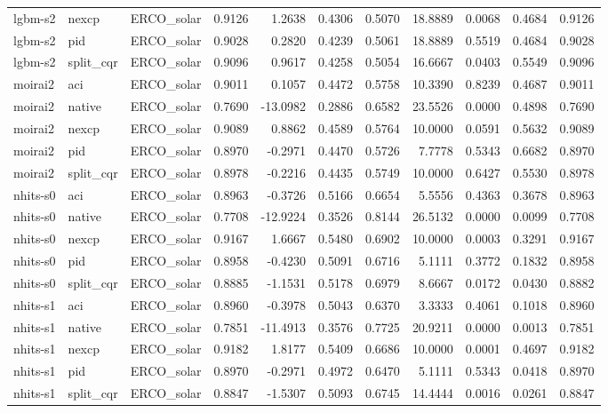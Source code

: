 \begin{tabular}{lllrrrrrrrr}
lgbm-s2 & nexcp & ERCO_solar & 0.9126 & 1.2638 & 0.4306 & 0.5070 & 18.8889 & 0.0068 & 0.4684 & 0.9126 \\
lgbm-s2 & pid & ERCO_solar & 0.9028 & 0.2820 & 0.4239 & 0.5061 & 18.8889 & 0.5519 & 0.4684 & 0.9028 \\
lgbm-s2 & split_cqr & ERCO_solar & 0.9096 & 0.9617 & 0.4258 & 0.5054 & 16.6667 & 0.0403 & 0.5549 & 0.9096 \\
moirai2 & aci & ERCO_solar & 0.9011 & 0.1057 & 0.4472 & 0.5758 & 10.3390 & 0.8239 & 0.4687 & 0.9011 \\
moirai2 & native & ERCO_solar & 0.7690 & -13.0982 & 0.2886 & 0.6582 & 23.5526 & 0.0000 & 0.4898 & 0.7690 \\
moirai2 & nexcp & ERCO_solar & 0.9089 & 0.8862 & 0.4589 & 0.5764 & 10.0000 & 0.0591 & 0.5632 & 0.9089 \\
moirai2 & pid & ERCO_solar & 0.8970 & -0.2971 & 0.4470 & 0.5726 & 7.7778 & 0.5343 & 0.6682 & 0.8970 \\
moirai2 & split_cqr & ERCO_solar & 0.8978 & -0.2216 & 0.4435 & 0.5749 & 10.0000 & 0.6427 & 0.5530 & 0.8978 \\
nhits-s0 & aci & ERCO_solar & 0.8963 & -0.3726 & 0.5166 & 0.6654 & 5.5556 & 0.4363 & 0.3678 & 0.8963 \\
nhits-s0 & native & ERCO_solar & 0.7708 & -12.9224 & 0.3526 & 0.8144 & 26.5132 & 0.0000 & 0.0099 & 0.7708 \\
nhits-s0 & nexcp & ERCO_solar & 0.9167 & 1.6667 & 0.5480 & 0.6902 & 10.0000 & 0.0003 & 0.3291 & 0.9167 \\
nhits-s0 & pid & ERCO_solar & 0.8958 & -0.4230 & 0.5091 & 0.6716 & 5.1111 & 0.3772 & 0.1832 & 0.8958 \\
nhits-s0 & split_cqr & ERCO_solar & 0.8885 & -1.1531 & 0.5178 & 0.6979 & 8.6667 & 0.0172 & 0.0430 & 0.8882 \\
nhits-s1 & aci & ERCO_solar & 0.8960 & -0.3978 & 0.5043 & 0.6370 & 3.3333 & 0.4061 & 0.1018 & 0.8960 \\
nhits-s1 & native & ERCO_solar & 0.7851 & -11.4913 & 0.3576 & 0.7725 & 20.9211 & 0.0000 & 0.0013 & 0.7851 \\
nhits-s1 & nexcp & ERCO_solar & 0.9182 & 1.8177 & 0.5409 & 0.6686 & 10.0000 & 0.0001 & 0.4697 & 0.9182 \\
nhits-s1 & pid & ERCO_solar & 0.8970 & -0.2971 & 0.4972 & 0.6470 & 5.1111 & 0.5343 & 0.0418 & 0.8970 \\
nhits-s1 & split_cqr & ERCO_solar & 0.8847 & -1.5307 & 0.5093 & 0.6745 & 14.4444 & 0.0016 & 0.0261 & 0.8847 \\

\end{tabular}

